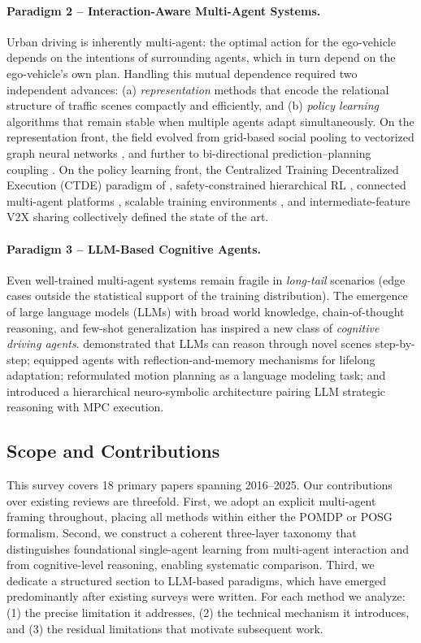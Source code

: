 \documentclass[12pt, a4paper]{article}
\begin{document}
\paragraph{Paradigm 2 -- Interaction-Aware Multi-Agent Systems.}
Urban driving is inherently multi-agent: the optimal action for the ego-vehicle
depends on the intentions of surrounding agents, which in turn depend on the
ego-vehicle's own plan. Handling this mutual dependence required two independent
advances: (a) \emph{representation} methods that encode the relational structure of
traffic scenes compactly and efficiently, and (b) \emph{policy learning} algorithms
that remain stable when multiple agents adapt simultaneously. On the representation
front, the field evolved from grid-based social pooling \citep{alahi2016social} to
vectorized graph neural networks \citep{gao2020vectornet}, and further to
bi-directional prediction--planning coupling \citep{song2020pip}. On the policy
learning front, the Centralized Training Decentralized Execution (CTDE) paradigm
of \citet{lowe2017multi}, safety-constrained hierarchical RL \citep{shalev2016safe},
connected multi-agent platforms \citep{palanisamy2020multi}, scalable training
environments \citep{zhou2020smarts}, and intermediate-feature V2X sharing
\citep{wang2020v2vnet} collectively defined the state of the art.

\paragraph{Paradigm 3 -- LLM-Based Cognitive Agents.}
Even well-trained multi-agent systems remain fragile in \emph{long-tail} scenarios
(edge cases outside the statistical support of the training distribution). The
emergence of large language models (LLMs) with broad world knowledge, chain-of-thought
reasoning, and few-shot generalization has inspired a new class of \emph{cognitive
driving agents}. \citet{fu2023drive} demonstrated that LLMs can reason through
novel scenes step-by-step; \citet{wen2023dilu} equipped agents with
reflection-and-memory mechanisms for lifelong adaptation; \citet{mao2023gpt}
reformulated motion planning as a language modeling task; and
\citet{sha2023languagempc} introduced a hierarchical neuro-symbolic architecture
pairing LLM strategic reasoning with MPC execution.

\subsection{Scope and Contributions}
This survey covers 18 primary papers spanning 2016--2025. Our contributions over
existing reviews \citep{kiran2021deep} are threefold. First, we adopt an explicit
multi-agent framing throughout, placing all methods within either the POMDP or
POSG formalism. Second, we construct a coherent three-layer taxonomy that
distinguishes foundational single-agent learning from multi-agent interaction and
from cognitive-level reasoning, enabling systematic comparison. Third, we dedicate
a structured section to LLM-based paradigms, which have emerged predominantly
after existing surveys were written. For each method we analyze: (1) the precise
limitation it addresses, (2) the technical mechanism it introduces, and (3) the
residual limitations that motivate subsequent work.
\end{document}
